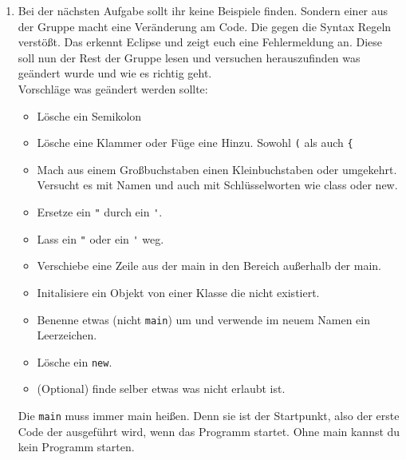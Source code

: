 \begin{enumerate}
    \item Bei der nächsten Aufgabe sollt ihr keine Beispiele finden. Sondern einer aus der Gruppe macht eine Veränderung am Code. Die gegen die Syntax Regeln verstößt. Das erkennt Eclipse und zeigt euch eine Fehlermeldung an. Diese soll nun der Rest der Gruppe lesen und versuchen herauszufinden was geändert wurde und wie es richtig geht.\\
          Vorschläge was geändert werden sollte:
          \begin{itemize}
              \item Lösche ein Semikolon
              \item Lösche eine Klammer oder Füge eine Hinzu. Sowohl \lstinline{(} als auch \lstinline{{}
              \item Mach aus einem Großbuchstaben einen Kleinbuchstaben oder umgekehrt. Versucht es mit Namen und auch mit Schlüsselworten wie class oder new.
              \item Ersetze ein \lstinline{"} durch ein \lstinline{'}.
              \item Lass ein \lstinline{"} oder ein \lstinline{'} weg.
              \item Verschiebe eine Zeile aus der main in den Bereich außerhalb der main.
              \item Initalisiere ein Objekt von einer Klasse die nicht existiert.
              \item Benenne etwas (nicht \lstinline{main}) um und verwende im neuem Namen ein Leerzeichen.
              \item Lösche ein \lstinline{new}.
              \item (Optional) finde selber etwas was nicht erlaubt ist.
          \end{itemize}
          \begin{Infobox}[main]
              Die \lstinline{main} muss immer main heißen. Denn sie ist der Startpunkt, also der erste Code der ausgeführt wird, wenn das Programm startet. Ohne main kannst du kein Programm starten.
          \end{Infobox}
\end{enumerate}

